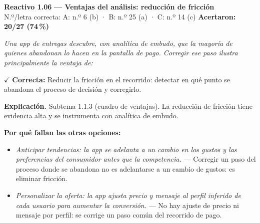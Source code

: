 \documentclass[10pt,letterpaper]{article}
\begin{document}
\begin{minipage}{\textwidth}
{\color{guinda}\textbf{Reactivo 1.06}} \textbf{— Ventajas del análisis: reducción de fricción}\\[-1pt]
{\scriptsize N.º/letra correcta: A: n.º 6 (b) · B: n.º 25 (a) · C: n.º 14 (c) \hfill \textbf{Acertaron: 20/27 (74\,\%)}}

\textit{Una app de entregas descubre, con analítica de embudo, que la mayoría de quienes abandonan lo hacen en la pantalla de pago. Corregir ese paso ilustra principalmente la ventaja de:}

\textcolor{verde}{$\checkmark$} \textbf{Correcta:} Reducir la fricción en el recorrido: detectar en qué punto se abandona el proceso de decisión y corregirlo.

\textbf{Explicación.} Subtema 1.1.3 (cuadro de ventajas). La reducción de fricción tiene evidencia alta y se instrumenta con analítica de embudo.

\textbf{Por qué fallan las otras opciones:}
\begin{itemize}[itemsep=0pt,topsep=1pt,leftmargin=1.3em,parsep=0pt]
\item[\textcolor{rojo}{$\times$}] \textit{Anticipar tendencias: la app se adelanta a un cambio en los gustos y las preferencias del consumidor antes que la competencia.} --- Corregir un paso del proceso donde se abandona no es adelantarse a un cambio de gustos: es eliminar fricción.
\item[\textcolor{rojo}{$\times$}] \textit{Personalizar la oferta: la app ajusta precio y mensaje al perfil inferido de cada usuario para aumentar la conversión.} --- No hay ajuste de precio ni mensaje por perfil: se corrige un paso común del recorrido de pago.
\end{itemize}
\end{minipage}\par\vspace{5pt}{\color{gray!40}\hrule}\vspace{5pt}
\end{document}
